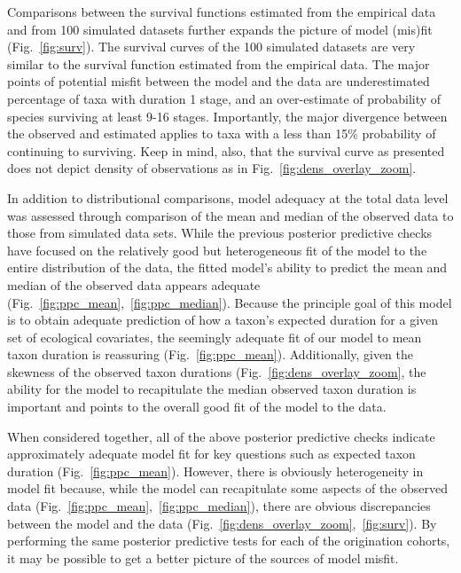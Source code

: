 \documentclass[11pt]{article}
\begin{document}
Comparisons between the survival functions estimated from the empirical data and from 100 simulated datasets further expands the picture of model (mis)fit (Fig.~\ref{fig:surv}). The survival curves of the 100 simulated datasets are very similar to the survival function estimated from the empirical data. The major points of potential misfit between the model and the data are underestimated percentage of taxa with duration 1 stage, and an over-estimate of probability of species surviving at least 9-16 stages. Importantly, the major divergence between the observed and estimated applies to taxa with a less than 15\% probability of continuing to surviving. Keep in mind, also, that the survival curve as presented does not depict density of observations as in Fig.~\ref{fig:dens_overlay_zoom}.

In addition to distributional comparisons, model adequacy at the total data level was assessed through comparison of the mean and median of the observed data to those from simulated data sets. While the previous posterior predictive checks have focused on the relatively good but heterogeneous fit of the model to the entire distribution of the data, the fitted model's ability to predict the mean and median of the observed data appears adequate (Fig.~\ref{fig:ppc_mean},~\ref{fig:ppc_median}). Because the principle goal of this model is to obtain adequate prediction of how a taxon's expected duration for a given set of ecological covariates, the seemingly adequate fit of our model to mean taxon duration is reassuring (Fig.~\ref{fig:ppc_mean}). Additionally, given the skewness of the observed taxon durations (Fig.~\ref{fig:dens_overlay_zoom}, the ability for the model to recapitulate the median observed taxon duration is important and points to the overall good fit of the model to the data.

When considered together, all of the above posterior predictive checks indicate approximately adequate model fit for key questions such as expected taxon duration (Fig.~\ref{fig:ppc_mean}). However, there is obviously heterogeneity in model fit because, while the model can recapitulate some aspects of the observed data (Fig.~\ref{fig:ppc_mean},~\ref{fig:ppc_median}), there are obvious discrepancies between the model and the data (Fig.~\ref{fig:dens_overlay_zoom},~\ref{fig:surv}). By performing the same posterior predictive tests for each of the origination cohorts, it may be possible to get a better picture of the sources of model misfit.
\end{document}
